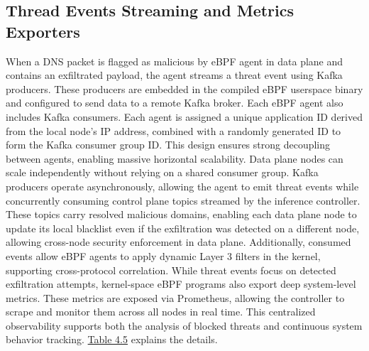 \documentclass [11pt, proquest] {uwthesis}[2020/02/24]
\begin{document}
\subsection{Thread Events Streaming and Metrics Exporters}
\label{sec:threat-event-streaming}
When a DNS packet is flagged as malicious by eBPF agent in data plane and contains an exfiltrated payload, the agent streams a threat event using Kafka producers. These producers are embedded in the compiled eBPF userspace binary and configured to send data to a remote Kafka broker. Each eBPF agent also includes Kafka consumers. Each agent is assigned a unique application ID derived from the local node’s IP address, combined with a randomly generated ID to form the Kafka consumer group ID. This design ensures strong decoupling between agents, enabling massive horizontal scalability. Data plane nodes can scale independently without relying on a shared consumer group. Kafka producers operate asynchronously, allowing the agent to emit threat events while concurrently consuming control plane topics streamed by the inference controller. These topics carry resolved malicious domains, enabling each data plane node to update its local blacklist even if the exfiltration was detected on a different node, allowing cross-node security enforcement in data plane. Additionally, consumed events allow eBPF agents to apply dynamic Layer 3 filters in the kernel, supporting cross-protocol correlation. While threat events focus on detected exfiltration attempts, kernel-space eBPF programs also export deep system-level metrics. These metrics are exposed via Prometheus, allowing the controller to scrape and monitor them across all nodes in real time. This centralized observability supports both the analysis of blocked threats and continuous system behavior tracking. \hyperref[tab:kafka-topics]{Table 4.5} explains the details.
\end{document}
